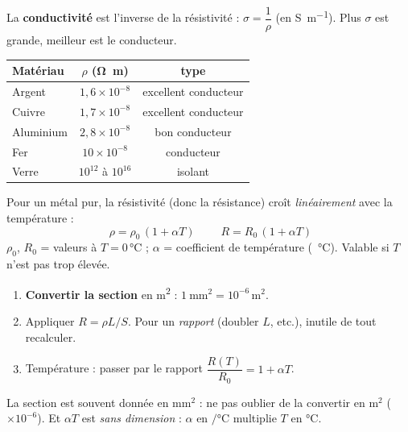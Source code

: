 \documentclass[11pt,a4paper]{article}
\begin{document}
\begin{cle}
La \textbf{conductivité} est l'inverse de la résistivité : $\sigma=\dfrac{1}{\rho}$ (en
\si{\siemens\per\metre}). Plus $\sigma$ est grande, meilleur est le conducteur.
\begin{center}\footnotesize
\renewcommand{\arraystretch}{1.1}
\begin{tabular}{lcc}
\toprule
\textbf{Matériau} & $\rho$ (\si{\ohm\metre}) & \textbf{type} \\
\midrule
Argent & $1{,}6\times10^{-8}$ & excellent conducteur \\
Cuivre & $1{,}7\times10^{-8}$ & excellent conducteur \\
Aluminium & $2{,}8\times10^{-8}$ & bon conducteur \\
Fer & $10\times10^{-8}$ & conducteur \\
Verre & $10^{12}$ à $10^{16}$ & isolant \\
\bottomrule
\end{tabular}
\end{center}
\end{cle}

\begin{cle}
Pour un métal pur, la résistivité (donc la résistance) croît \emph{linéairement} avec la température :
\[ \boxed{\;\rho=\rho_0\,(1+\alpha T)\;}\qquad R=R_0\,(1+\alpha T) \]
$\rho_0$, $R_0$ = valeurs à $T=0\,\si{\degreeCelsius}$ ; $\alpha$ = coefficient de température
(\si{\per\degreeCelsius}). Valable si $T$ n'est pas trop élevée.
\end{cle}

\begin{methode}
\begin{enumerate}[leftmargin=1.7em,topsep=1pt,itemsep=0pt]
  \item \textbf{Convertir la section} en \si{\metre\squared} : $\qty{1}{\milli\metre\squared}=10^{-6}\,\si{\metre\squared}$.
  \item Appliquer $R=\rho L/S$. Pour un \emph{rapport} (doubler $L$, etc.), inutile de tout recalculer.
  \item Température : passer par le rapport $\dfrac{R(T)}{R_0}=1+\alpha T$.
\end{enumerate}
\end{methode}

\begin{piege}
La section est souvent donnée en $\si{\milli\metre\squared}$ : ne pas oublier de la convertir en
$\si{\metre\squared}$ ($\times10^{-6}$). Et $\alpha T$ est \emph{sans dimension} : $\alpha$ en
$\si{\per\degreeCelsius}$ multiplie $T$ en $\si{\degreeCelsius}$.
\end{piege}
\end{document}
